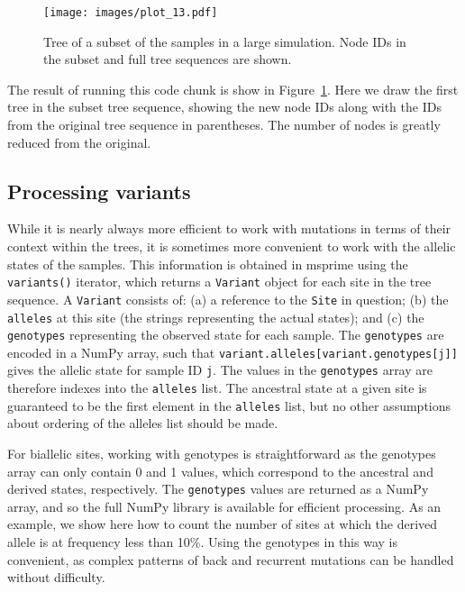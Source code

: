 \documentclass[graybox]{svmult}
\begin{document}
\begin{figure}[t]
\centering
\texttt{[image: images/plot\_13.pdf]}
\caption{\label{fig-tree-subset} Tree of a subset of the samples in a large
simulation. Node IDs in the subset and full tree sequences are shown.}
\end{figure}

The result of running this code chunk is show in Figure~\ref{fig-tree-subset}.
Here we draw the first tree in the subset tree sequence, showing the new
node IDs along with the IDs from the original tree sequence in
parentheses. The number of nodes is greatly reduced from the original.

\subsection{Processing variants}\label{processing-variants}

While it is nearly always more efficient to work with mutations in terms
of their context within the trees, it is sometimes more convenient to
work with the allelic states of the samples. This information is
obtained in msprime using the \texttt{variants()} iterator, which
returns a \texttt{Variant} object for each site in the tree sequence. A
\texttt{Variant} consists of: (a) a reference to the \texttt{Site} in question;
(b) the \texttt{alleles} at this site (the strings representing the
actual states); and (c) the \texttt{genotypes} representing the observed
state for each sample. The \texttt{genotypes} are encoded in a NumPy
array, such that \texttt{variant.alleles{[}variant.genotypes{[}j{]}{]}}
gives the allelic state for sample ID \texttt{j}. The values in the
\texttt{genotypes} array are therefore indexes into the \texttt{alleles}
list. The ancestral state at a given site is guaranteed to be the first
element in the \texttt{alleles} list, but no other assumptions about
ordering of the alleles list should be made.

For biallelic sites, working with genotypes is straightforward as the
genotypes array can only contain 0 and 1 values, which correspond to
the ancestral and derived states, respectively. The \texttt{genotypes}
values are returned as a NumPy array, and so the full NumPy library is
available for efficient processing. As an example, we show here how to
count the number of sites at which the derived allele is at frequency
less than 10\%. Using the genotypes in this way is convenient, as
complex patterns of back and recurrent mutations can be handled without
difficulty.
\end{document}
